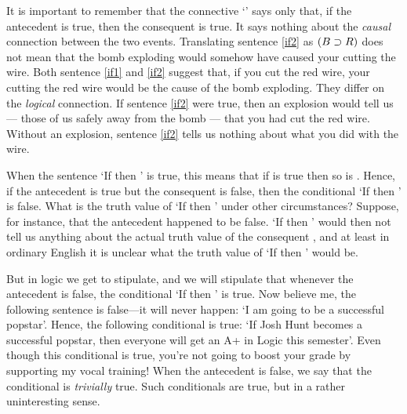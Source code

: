 It is important to remember that the connective `\eif' says only that, if the antecedent is true, then the consequent is true. It says nothing about the \emph{causal} connection between the two events. Translating sentence \ref{if2} as $(B \supset R)$ does not mean that the bomb exploding would somehow have caused your cutting the wire. Both sentence \ref{if1} and \ref{if2} suggest that, if you cut the red wire, your cutting the red wire would be the cause of the bomb exploding. They differ on the \emph{logical} connection. If sentence \ref{if2} were true, then an explosion would tell us --- those of us safely away from the bomb --- that you had cut the red wire. Without an explosion, sentence \ref{if2} tells us nothing about what you did with the wire.



When the sentence `If \metaA{} then \metaB{}' is true, this means that if \metaA{} is true then so is \metaB{}. Hence, if the antecedent \metaA{} is true but the consequent \metaB{} is false, then the conditional `If \metaA{} then \metaB{}' is false. What is the truth value of `If \metaA{} then \metaB{}' under other circumstances? Suppose, for instance, that the antecedent \metaA{} happened to be false. `If \metaA{} then \metaB{}' would then not tell us anything about the actual truth value of the consequent \metaB{}, and at least in ordinary English it is unclear what the truth value of `If \metaA{} then \metaB{}' would be. 

{\color{black}But in logic we get to stipulate, and we will stipulate that whenever the antecedent \metaA{} is false, the conditional  `If \metaA{} then \metaB{}' is true. Now believe me, the following sentence is false---it will never happen: `I am going to be a successful popstar'. Hence, the following conditional is true: `If Josh Hunt becomes a successful popstar, then everyone will get an A+ in Logic this semester'. Even though this conditional is true, you're not going to boost your grade by supporting my vocal training! When the antecedent is false, we say that the conditional is \textit{trivially} true. Such conditionals are true, but in a rather uninteresting sense.} 


